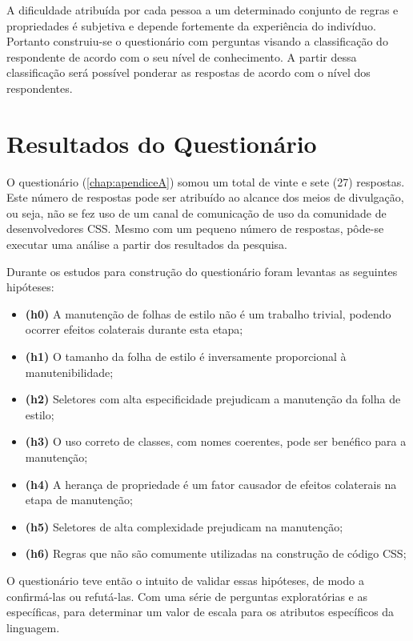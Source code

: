 A dificuldade atribuída por cada pessoa a um determinado conjunto de regras e propriedades é subjetiva e depende fortemente da experiência do indivíduo. Portanto construiu-se o questionário com perguntas visando a classificação do respondente de acordo com o seu nível de conhecimento. A partir dessa classificação será possível ponderar as respostas de acordo com o nível dos respondentes.

\section{Resultados do Questionário}

O questionário (\autoref{chap:apendiceA}) somou um total de vinte e sete (27) respostas. Este número de respostas pode ser atribuído ao alcance dos meios de divulgação, ou seja, não se fez uso de um canal de comunicação de uso da comunidade de desenvolvedores CSS. Mesmo com um pequeno número de respostas, pôde-se executar uma análise a partir dos resultados da pesquisa. 

Durante os estudos para construção do questionário foram levantas as seguintes hipóteses:

\begin{itemize}
	\item \textbf{(h0)} A manutenção de folhas de estilo não é um trabalho trivial, podendo ocorrer efeitos colaterais durante esta etapa;
	\item \textbf{(h1)} O tamanho da folha de estilo é inversamente proporcional à manutenibilidade;
	\item \textbf{(h2)} Seletores com alta especificidade prejudicam a manutenção da folha de estilo;
	\item \textbf{(h3)} O uso correto de classes, com nomes coerentes, pode ser benéfico para a manutenção;
	\item \textbf{(h4)} A herança de propriedade é um fator causador de efeitos colaterais na etapa de manutenção;
	\item \textbf{(h5)} Seletores de alta complexidade prejudicam na manutenção;
	\item \textbf{(h6)} Regras que não são comumente utilizadas na construção de código CSS;
\end{itemize}

O questionário teve então o intuito de validar essas hipóteses, de modo a confirmá-las ou refutá-las. Com uma série de perguntas exploratórias e as específicas, para determinar um valor de escala para os atributos específicos da linguagem.

